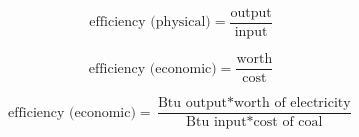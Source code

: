 
\begin{equation} \label{stea-4-6-2-1}
\textrm{efficiency (physical)}=\frac{\textrm{output}}{\textrm{input}}
\end{equation}

\begin{equation} \label{stea-4-6-2-2}
\textrm{efficiency (economic)}=\frac{\textrm{worth}}{\textrm{cost}}
\end{equation}

\begin{equation} \label{stea-4-6-2-3}
\textrm{efficiency (economic)}=\frac{\textrm{Btu output}*\textrm{worth of electricity}}{\textrm{Btu input}*\textrm{cost of coal}}
\end{equation}
